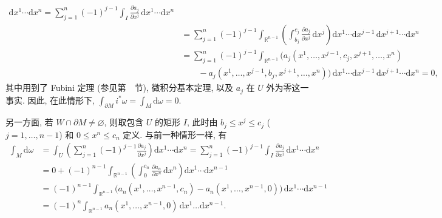 \begin{RiemannProof}
\begin{align*}
    \mathrm{d}x^1\cdots\mathrm{d}x^n
  =\sum_{j=1}^n(-1)^{j-1}\int_I\frac{\partial a_j}{\partial x^j}\,\mathrm{d}x^1\cdots\mathrm{d}x^n\\
  &=\sum_{j=1}^n(-1)^{j-1}\int_{\mathbb{R}^{n-1}}
    \left(\int_{b_j}^{c_j}\frac{\partial a_j}{\partial x^j}\,\mathrm{d}x^j\right)
    \mathrm{d}x^1\cdots\mathrm{d}x^{j-1}\,\mathrm{d}x^{j+1}\cdots\mathrm{d}x^n\\
  &=\sum_{j=1}^n(-1)^{j-1}\int_{\mathbb{R}^{n-1}}
    \bigl(a_j(x^1,\ldots,x^{j-1},c_j,x^{j+1},\ldots,x^n)\\
  &\qquad{}-a_j(x^1,\ldots,x^{j-1},b_j,x^{j+1},\ldots,x^n)\bigr)
    \,\mathrm{d}x^1\cdots\mathrm{d}x^{j-1}\,\mathrm{d}x^{j+1}\cdots\mathrm{d}x^n=0,
\end{align*}
其中用到了 Fubini 定理 (参见第~~节), 微积分基本定理, 以及 $a_j$ 在 $U$ 外为零这一事实. 因此, 在此情形下, $\int_{\partial M}i^*\omega=\int_M\mathrm{d}\omega=0$.

另一方面, 若 $W\cap\partial M\ne\varnothing$, 则取包含 $U$ 的矩形 $I$, 此时由 $b_j\leq x^j\leq c_j$ ($j=1,\ldots,n-1$) 和 $0\leq x^n\leq c_n$ 定义. 与前一种情形一样, 有
\begin{align*}
  \int_M\mathrm{d}\omega
  &=\int_U\left(\sum_{j=1}^n(-1)^{j-1}\frac{\partial a_j}{\partial x^j}\right)
    \mathrm{d}x^1\cdots\mathrm{d}x^n
    =\sum_{j=1}^n(-1)^{j-1}\int_I\frac{\partial a_j}{\partial x^j}\,\mathrm{d}x^1\cdots\mathrm{d}x^n\\
  &=0+(-1)^{n-1}\int_{\mathbb{R}^{n-1}}
    \left(\int_0^{c_n}\frac{\partial a_n}{\partial x^n}\,\mathrm{d}x^n\right)
    \mathrm{d}x^1\cdots\mathrm{d}x^{n-1}\\
  &=(-1)^{n-1}\int_{\mathbb{R}^{n-1}}
    \bigl(a_n(x^1,\ldots,x^{n-1},c_n)-a_n(x^1,\ldots,x^{n-1},0)\bigr)
    \,\mathrm{d}x^1\cdots\mathrm{d}x^{n-1}\\
  &=(-1)^n\int_{\mathbb{R}^{n-1}}a_n(x^1,\ldots,x^{n-1},0)\,\mathrm{d}x^1\ldots\mathrm{d}x^{n-1}.
\end{align*}


\end{RiemannProof}
